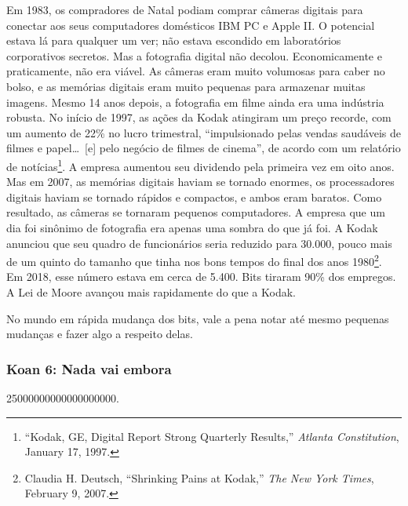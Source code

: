 Em 1983, os compradores de Natal podiam comprar câmeras digitais para conectar 
aos seus computadores domésticos IBM PC e Apple II. O potencial estava lá para 
qualquer um ver; não estava escondido em laboratórios corporativos secretos. Mas 
a fotografia digital não decolou. Economicamente e praticamente, não era viável.
As câmeras eram muito volumosas para caber no bolso, e as memórias digitais eram
muito pequenas para armazenar muitas imagens. Mesmo 14 anos depois, a fotografia
em filme ainda era uma indústria robusta.  No início de 1997, as
ações da Kodak atingiram um preço recorde, com um aumento de 22\% no lucro
trimestral, ``impulsionado pelas vendas saudáveis de filmes e papel\ldots\ [e]
pelo negócio de filmes de cinema'', de acordo com um relatório de
notícias\footnote{``Kodak, GE, Digital Report Strong Quarterly Results,''
\textit{Atlanta Constitution}, January 17, 1997.}. A empresa aumentou seu
dividendo pela primeira vez em oito anos. Mas em 2007, as memórias digitais
haviam se tornado enormes, os processadores digitais haviam se tornado rápidos e
compactos, e ambos eram baratos. Como resultado, as câmeras se tornaram pequenos
computadores. A empresa que um dia foi sinônimo de fotografia era apenas uma
sombra do que já foi. 
A Kodak anunciou que seu
quadro de funcionários seria reduzido para 30.000, pouco  mais de um quinto do
tamanho que tinha nos bons tempos do final dos anos 
1980\footnote{Claudia H. Deutsch, ``Shrinking Pains at Kodak,'' \textit{The New
York Times}, February 9, 2007.}. Em 2018, esse número estava em cerca de 5.400.
Bits tiraram 90\% dos empregos. A Lei de Moore avançou mais rapidamente do que a
Kodak.

No mundo em rápida mudança dos bits, vale a pena notar até mesmo pequenas
mudanças e fazer algo a respeito delas.

\subsubsection*{Koan 6: Nada vai embora}
\label{cap1:exp-dig-koans:6}
\num{25000000000000000000}.

